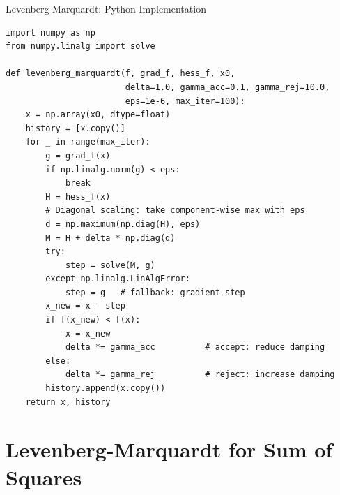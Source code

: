 \documentclass[aspectratio=169,10pt]{beamer}
\begin{document}
\begin{frame}[fragile]{Levenberg-Marquardt: Python Implementation}
\begin{lstlisting}[caption={Levenberg-Marquardt algorithm in Python (NumPy)}]
import numpy as np
from numpy.linalg import solve

def levenberg_marquardt(f, grad_f, hess_f, x0,
                        delta=1.0, gamma_acc=0.1, gamma_rej=10.0,
                        eps=1e-6, max_iter=100):
    x = np.array(x0, dtype=float)
    history = [x.copy()]
    for _ in range(max_iter):
        g = grad_f(x)
        if np.linalg.norm(g) < eps:
            break
        H = hess_f(x)
        # Diagonal scaling: take component-wise max with eps
        d = np.maximum(np.diag(H), eps)
        M = H + delta * np.diag(d)
        try:
            step = solve(M, g)
        except np.linalg.LinAlgError:
            step = g   # fallback: gradient step
        x_new = x - step
        if f(x_new) < f(x):
            x = x_new
            delta *= gamma_acc          # accept: reduce damping
        else:
            delta *= gamma_rej          # reject: increase damping
        history.append(x.copy())
    return x, history
\end{lstlisting}
\end{frame}

\section{Levenberg-Marquardt for Sum of Squares}
\end{document}
